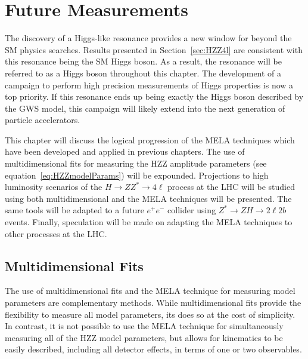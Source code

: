 \chapter{Future Measurements}
\label{sec:FutureMeasurements}

The discovery of a Higgs-like resonance provides a new window
for beyond the SM physics searches.  Results presented in 
Section~\ref{sec:HZZ4l} are consistent with this resonance 
being the SM Higgs boson.  As a result, the resonance will be
referred to as a Higgs boson throughout this chapter. 
The development of a campaign to perform high precision
measurements of Higgs properties is now a top priority.
If this resonance ends up 
being exactly the Higgs boson described by the GWS model, 
this campaign will likely extend into the next generation of 
particle accelerators.  

This chapter will discuss the logical progression of the MELA
techniques which have been developed and applied in previous 
chapters.  The use of multidimensional fits for measuring the 
HZZ amplitude parameters (see
equation~\ref{eq:HZZmodelParams}) will be expounded.  
Projections to high luminosity scenarios of the $H\to ZZ^*\to4\ell$
process at the LHC will be studied using both multidimensional
and the MELA techniques will be presented.  The same tools will
be adapted to a future $e^+e^-$ collider using $Z^*\to ZH\to 2\ell2b$
events.   Finally, speculation will be made on adapting the MELA
techniques to other processes at the LHC.

\section{Multidimensional Fits}

The use of multidimensional fits 
and the MELA technique for measuring model parameters are 
complementary methods.  While multidimensional fits provide 
the flexibility to measure all model parameters, its does so at
the cost of simplicity. In contrast, it is not possible to use
the MELA 
technique for simultaneously measuring all of the HZZ model 
parameters, but allows for 
kinematics to be easily described, including all detector effects,
in terms of one or two observables. 

